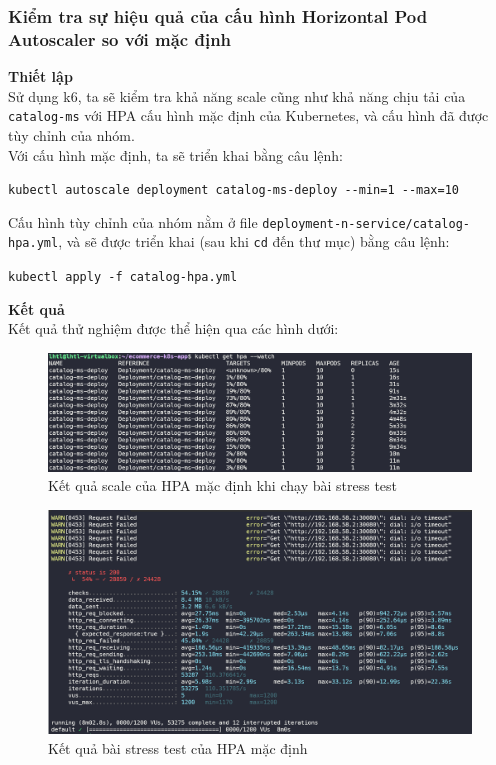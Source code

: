 \subsubsection{Kiểm tra sự hiệu quả của cấu hình Horizontal Pod Autoscaler so với mặc định}
\noindent \textbf{Thiết lập}\\[0.5cm]
Sử dụng k6, ta sẽ kiểm tra khả năng scale cũng như khả năng chịu tải của \lstinline|catalog-ms| với HPA cấu hình mặc định của Kubernetes, và cấu hình đã được tùy chỉnh của nhóm.\\[0.5cm]
Với cấu hình mặc định, ta sẽ triển khai bằng câu lệnh:
\begin{center}
  \lstinline|kubectl autoscale deployment catalog-ms-deploy --min=1 --max=10|
\end{center}
Cấu hình tùy chỉnh của nhóm nằm ở file \lstinline|deployment-n-service/catalog-hpa.yml|, và sẽ được triển khai (sau khi \lstinline|cd| đến thư mục) bằng câu lệnh:
\begin{center}
  \lstinline|kubectl apply -f catalog-hpa.yml|
\end{center}
\textbf{Kết quả}\\[0.5cm]
Kết quả thử nghiệm được thể hiện qua các hình dưới:
\begin{figure}[H]
  \begin{center}
      \includegraphics[scale = 0.45]{images/hanh/hpa_efficent_test/default-2}
      \vspace*{1mm}
  \end{center}
  \caption{Kết quả scale của HPA mặc định khi chạy bài stress test}
  \label{fig:HPA-default-scale}
\end{figure}
\begin{figure}[H]
  \begin{center}
      \includegraphics[scale = 0.45]{images/hanh/hpa_efficent_test/default-2-test-result}
      \vspace*{1mm}
  \end{center}
  \caption{Kết quả bài stress test của HPA mặc định}
  \label{fig:HPA-default-scale-result}
\end{figure}
